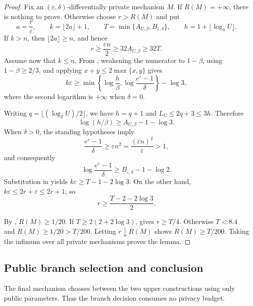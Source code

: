 \documentclass[11pt]{article}
\begin{document}
\begin{proof}
Fix an $(\varepsilon,\delta)$-differentially private mechanism $M$.  If
$R(M)=+\infty$, there is nothing to prove.  Otherwise choose $r>R(M)$ and
put
\[
 a=\frac r\varepsilon,
 \qquad
 k=\lfloor2a\rfloor+1,
 \qquad
 T=\min\{A_{U,\beta},B_{\varepsilon,\delta}\},
 \qquad
 h=1+\lfloor\log_4U\rfloor.
\]
If $k>n$, then $\lfloor2a\rfloor\ge n$, and hence
\[
 r\ge\frac{\varepsilon n}{2}
 \ge32A_{U,\beta}\ge32T.
\]
Assume now that $k\le n$.  From , weakening the
numerator to $1-\beta$, using $1-\beta\ge2/3$, and applying
$x+y\le2\max\{x,y\}$ gives
\begin{equation}
 k\varepsilon
 \ge\min\left\{
  \log\frac h\beta,
  \log\frac{e^\varepsilon-1}{\delta}
 \right\}-\log3,
 \label{eq:two-log-lower}
\end{equation}
where the second logarithm is $+\infty$ when $\delta=0$.

Writing $q=\lfloor(\log_2U)/2\rfloor$, we have $h=q+1$ and
$L_U\le2q+3\le3h$.  Therefore
\[
 \log(h/\beta)\ge A_{U,\beta}-1-\log3.
\]
When $\delta>0$, the standing hypotheses imply
\[
 \frac{e^\varepsilon-1}{\delta}
 \ge\varepsilon n^2
 =\frac{(\varepsilon n)^2}{\varepsilon}>1,
\]
and consequently
\[
 \log\frac{e^\varepsilon-1}{\delta}
 \ge B_{\varepsilon,\delta}-1-\log2.
\]
Substitution in  yields
$k\varepsilon\ge T-1-2\log3$.  On the other hand,
$k\varepsilon\le2r+\varepsilon\le2r+1$, so
\begin{equation}
 r\ge\frac{T-2-2\log3}{2}.
 \label{eq:lower-up-to-constant}
\end{equation}

By , $R(M)\ge1/20$.  If
$T\ge2(2+2\log3)$,  gives $r\ge T/4$.
Otherwise $T<8.4$ and $R(M)\ge1/20>T/200$.  Letting
$r\downarrow R(M)$ shows $R(M)\ge T/200$.  Taking the infimum over all
private mechanisms proves the lemma.
\end{proof}

\subsection{Public branch selection and conclusion}

The final mechanism chooses between the two upper constructions using only
public parameters.  Thus the branch decision consumes no privacy budget.
\end{document}
